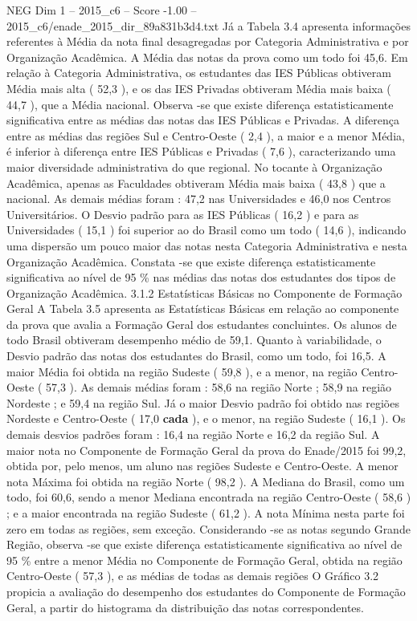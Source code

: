 \begin{textsample}{NEG Dim 1 – 2015\_c6 – Score -1.00 – 2015\_c6/enade\_2015\_dir\_89a831b3d4.txt}
Já a Tabela 3.4 apresenta informações referentes à Média da nota final desagregadas por Categoria Administrativa e por Organização Acadêmica.
A Média das notas da prova como um todo foi 45,6.
Em relação à Categoria Administrativa, os estudantes das IES Públicas obtiveram Média mais alta ( 52,3 ), e os das IES Privadas obtiveram Média mais baixa ( 44,7 ), que a Média nacional.
Observa -se que existe diferença estatisticamente significativa entre as médias das notas das IES Públicas e Privadas.
A diferença entre as médias das regiões Sul e Centro-Oeste ( 2,4 ), a maior e a menor Média, é inferior à diferença entre IES Públicas e Privadas ( 7,6 ), caracterizando uma maior diversidade administrativa do que regional.
No tocante à Organização Acadêmica, apenas as Faculdades obtiveram Média mais baixa ( 43,8 ) que a nacional.
As demais médias foram : 47,2 nas Universidades e 46,0 nos Centros Universitários.
O Desvio padrão para as IES Públicas ( 16,2 ) e para as Universidades ( 15,1 ) foi superior ao do Brasil como um todo ( 14,6 ), indicando uma dispersão um pouco maior das notas nesta Categoria Administrativa e nesta Organização Acadêmica.
Constata -se que existe diferença estatisticamente significativa ao nível de 95 \% nas médias das notas dos estudantes dos tipos de Organização Acadêmica. 3.1.2 Estatísticas Básicas no Componente de Formação Geral A Tabela 3.5 apresenta as Estatísticas Básicas em relação ao componente da prova que avalia a Formação Geral dos estudantes concluintes.
Os alunos de todo Brasil obtiveram desempenho médio de 59,1.
Quanto à variabilidade, o Desvio padrão das notas dos estudantes do Brasil, como um todo, foi 16,5.
A maior Média foi obtida na região Sudeste ( 59,8 ), e a menor, na região Centro-Oeste ( 57,3 ).
As demais médias foram : 58,6 na região Norte ; 58,9 na região Nordeste ; e 59,4 na região Sul.
Já o maior Desvio padrão foi obtido nas regiões Nordeste e Centro-Oeste ( 17,0 \textbf{cada} ), e o menor, na região Sudeste ( 16,1 ).
Os demais desvios padrões foram : 16,4 na região Norte e 16,2 da região Sul.
A maior nota no Componente de Formação Geral da prova do Enade/2015 foi 99,2, obtida por, pelo menos, um aluno nas regiões Sudeste e Centro-Oeste.
A menor nota Máxima foi obtida na região Norte ( 98,2 ).
A Mediana do Brasil, como um todo, foi 60,6, sendo a menor Mediana encontrada na região Centro-Oeste ( 58,6 ) ; e a maior encontrada na região Sudeste ( 61,2 ).
A nota Mínima nesta parte foi zero em todas as regiões, sem exceção.
Considerando -se as notas segundo Grande Região, observa -se que existe diferença estatisticamente significativa ao nível de 95 \% entre a menor Média no Componente de Formação Geral, obtida na região Centro-Oeste ( 57,3 ), e as médias de todas as demais regiões O Gráfico 3.2 propicia a avaliação do desempenho dos estudantes do Componente de Formação Geral, a partir do histograma da distribuição das notas correspondentes.

\end{textsample}
